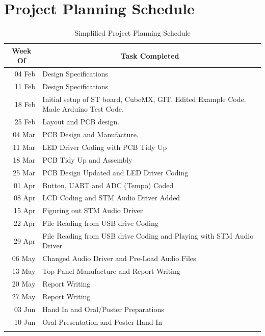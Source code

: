 \documentclass[12pt,a4paper]{report}
\begin{document}
\appendix
\chapter{Project Planning Schedule}

	\begin{longtable}[c]{|r|p{10cm}|}
		\hline
		\multicolumn{1}{|c|}{\textbf{Week Of}} & \multicolumn{1}{c|}{\textbf{Task Completed}} \\
		\hline
		04 Feb & Design Specifications \\
		\hline
		11 Feb & Design Specifications \\
		\hline
		18 Feb & Initial setup of ST board, CubeMX, GIT. \newline Edited Example Code. Made Arduino Test Code. \\
		\hline
		25 Feb & Layout and PCB design. \\
		\hline
		04 Mar & PCB Design and Manufacture. \\
		\hline
		11 Mar & LED Driver Coding with PCB Tidy Up \\
		\hline
		18 Mar & PCB Tidy Up and Assembly \\
		\hline
		25 Mar & PCB Design Updated and LED Driver Coding \\
		\hline
		01 Apr & Button, UART and ADC (Tempo) Coded  \\
		\hline
		08 Apr & LCD Coding and STM Audio Driver Added \\
		\hline
		15 Apr & Figuring out STM Audio Driver \\
		\hline
		22 Apr & File Reading from USB drive Coding \\
		\hline
		29 Apr & File Reading from USB drive Coding and \newline Playing with STM Audio Driver \\
		\hline
		06 May & Changed Audio Driver and Pre-Load Audio Files \\
		\hline
		13 May & Top Panel Manufacture and Report Writing \\
		\hline
		20 May & Report Writing \\
		\hline
		27 May & Report Writing \\
		\hline
		03 Jun & Hand In and Oral/Poster Preparations \\
		\hline
		10 Jun & Oral Presentation and Poster Hand In \\
		\hline
		\caption{Simplified Project Planning Schedule}
	\end{longtable}%
\end{document}
